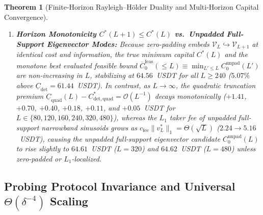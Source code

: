 \documentclass[12pt]{article}
\newtheorem{theorem}{Theorem}[section]
\theoremstyle{definition}
\theoremstyle{remark}
\begin{document}
\begin{theorem}[Finite-Horizon Rayleigh--H\"older Duality and Multi-Horizon Capital Convergence]
\begin{enumerate}
alongside the 50-digit worst-box enclosure $64.7422880828$~USDT in \texttt{TC-C1}, kernel-checked in Lean~4 as \nolinkurl{numerical_certificate_64_74_rational_enclosure}; analytical stationary-point minimum $64.7430$~USDT in \texttt{TC-C2}; and $100{,}000$ interior probes with minimum $64.7433$~USDT and zero violations in \texttt{TC-C3}). Finally, for any flat round-trip probe ($\sum_{t=0}^L v_t = 0$), telescopic summation of the double-entry cash account $K_{t+1} = K_t - v_t(p_{i,t} + \tfrac{1}{2}\kappa v_t) - c_{\mathrm{fee}}|v_t|$ proves that terminal cash loss $E_0 - E_{L+1}$ equals $\frac{1}{2}v^\top T_{h_i} v + c_{\mathrm{fee}}\|v\|_1$ identically without reference-price drift (kernel-checked in Lean~4 as \nolinkurl{flat_round_trip_double_entry_terminal_loss_identity} and verified numerically in \texttt{TC-C5} to $2.98 \times 10^{-13}$~USDT discrepancy).
\item \textbf{Horizon Monotonicity $C^*(L+1) \le C^*(L)$ vs.\ Unpadded Full-Support Eigenvector Modes:} Because zero-padding embeds $\mathcal{V}_L \hookrightarrow \mathcal{V}_{L+1}$ at identical cost and information, the true minimum capital $C^*(L)$ and the monotone best evaluated feasible bound $\overline{C}_0^{\mathrm{feas}}(\le L) \equiv \min_{L' \le L} C_0^{\mathrm{unpad}}(L')$ are non-increasing in $L$, stabilizing at $64.56$~USDT for all $L \ge 240$ ($5.07\%$ above $\underline{C}_{\mathrm{det}} = 61.44$~USDT). In contrast, as $L \to \infty$, the quadratic truncation premium $\underline{C}_{\mathrm{quad}}(L) - C^*_{\mathrm{det,quad}} = \mathcal{O}(L^{-1})$ decays monotonically ($+1.41$, $+0.70$, $+0.40$, $+0.18$, $+0.11$, and $+0.05$~USDT for $L \in \{80, 120, 160, 240, 320, 480\}$), whereas the $L_1$ taker fee of unpadded full-support narrowband sinusoids grows as $c_{\mathrm{fee}}\|v^*_L\|_1 = \Theta(\sqrt{L})$ ($2.24 \to 5.16$~USDT), causing the unpadded full-support eigenvector candidate $C_0^{\mathrm{unpad}}(L)$ to rise slightly to $64.61$~USDT ($L=320$) and $64.62$~USDT ($L=480$) unless zero-padded or $L_1$-localized.
\end{enumerate}
\end{theorem}




\subsection{Probing Protocol Invariance and Universal \texorpdfstring{$\Theta(\delta^{-4})$}{Theta(delta\textasciicircum-4)} Scaling}
\label{ia:probing_invariance}
\end{document}
